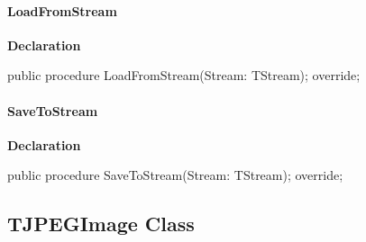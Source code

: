 \documentclass{report}
\newif\ifpdf
\begin{document}
\paragraph*{LoadFromStream}\hspace*{\fill}

\label{opbitmapformats.TGIFImage-LoadFromStream}
\begin{list}{}{
\setlength{\itemindent}{0cm}
\setlength{\listparindent}{0cm}
\setlength{\leftmargin}{\evensidemargin}
\addtolength{\leftmargin}{\tmplength}
\settowidth{\labelsep}{X}
\addtolength{\leftmargin}{\labelsep}
\setlength{\labelwidth}{\tmplength}
}
\item[\textbf{Declaration}\hfill]
\ifpdf
\begin{flushleft}
\fi
\begin{ttfamily}
public procedure LoadFromStream(Stream: TStream); override;\end{ttfamily}

\ifpdf
\end{flushleft}
\fi

\end{list}
\paragraph*{SaveToStream}\hspace*{\fill}

\label{opbitmapformats.TGIFImage-SaveToStream}
\begin{list}{}{
\setlength{\itemindent}{0cm}
\setlength{\listparindent}{0cm}
\setlength{\leftmargin}{\evensidemargin}
\addtolength{\leftmargin}{\tmplength}
\settowidth{\labelsep}{X}
\addtolength{\leftmargin}{\labelsep}
\setlength{\labelwidth}{\tmplength}
}
\item[\textbf{Declaration}\hfill]
\ifpdf
\begin{flushleft}
\fi
\begin{ttfamily}
public procedure SaveToStream(Stream: TStream); override;\end{ttfamily}

\ifpdf
\end{flushleft}
\fi

\end{list}
\ifpdf
\subsection*{\large{\textbf{TJPEGImage Class}}\normalsize\hspace{1ex}\hrulefill}
\else
\end{document}
